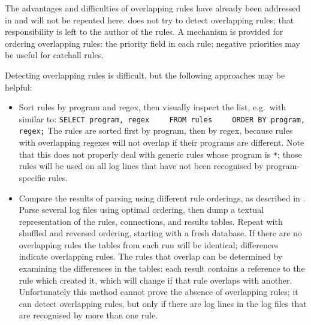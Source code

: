 \label{overlapping rules in implementation}

The advantages and difficulties of overlapping rules have already been
addressed in  and will not be
repeated here.  \parsername{} does not try to detect overlapping rules;
that responsibility is left to the author of the rules.  A mechanism is
provided for ordering overlapping rules: the priority field in each rule;
negative priorities may be useful for catchall rules.

Detecting overlapping rules is difficult, but the following approaches may
be helpful:

\begin{itemize}

    \item Sort rules by program and regex, then visually inspect the list,
        e.g.\ with  similar to:    \newline{}
        \verb!SELECT program, regex!            \newline{}
        \verb!    FROM rules!                   \newline{}
        \verb!    ORDER BY program, regex;!     \newline{}
        The rules are sorted first by program, then by regex, because rules
        with overlapping regexes will not overlap if their programs are
        different.  Note that this does not properly deal with generic
        rules whose program is \texttt{*}; those rules will be used on all
        log lines that have not been recognised by program-specific rules.

    \item Compare the results of parsing using different rule orderings, as
        described in .  Parse
        several log files using optimal ordering, then dump a textual
        representation of the rules, connections, and results tables.
        Repeat with shuffled and reversed ordering, starting with a fresh
        database.  If there are no overlapping rules the tables from each
        run will be identical; differences indicate overlapping rules.
        The rules that overlap can be determined by examining the
        differences in the tables: each result contains a reference to the
        rule which created it, which will change if that rule overlaps with
        another.  Unfortunately this method cannot prove the absence of
        overlapping rules; it can detect overlapping rules, but only if
        there are log lines in the log files that are recognised by more
        than one rule.

\end{itemize}

